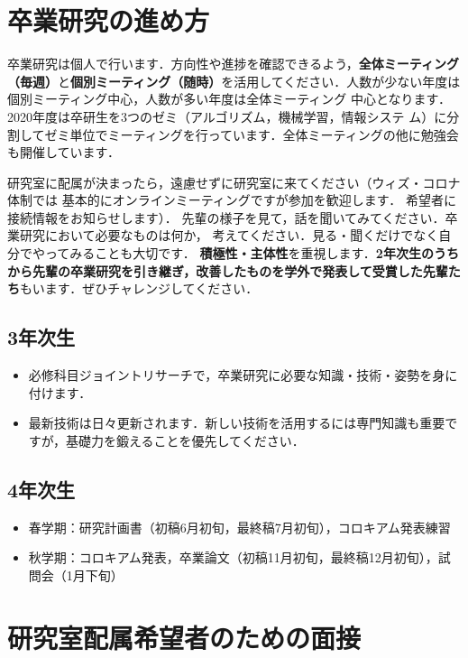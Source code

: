 \documentclass[uplatex,jis2004,a4paper]{jsarticle}
\renewcommand{\emph}[1]{\textbf{#1}}
\begin{document}
\clearpage
\section{卒業研究の進め方}

卒業研究は個人で行います．方向性や進捗を確認できるよう，\emph{全体ミーティング（毎週）}と\emph{個別ミーティング（随時）}を活用してください．人数が少ない年度は個別ミーティング中心，人数が多い年度は全体ミーティング
中心となります．2020年度は卒研生を3つのゼミ（アルゴリズム，機械学習，情報システ
ム）に分割してゼミ単位でミーティングを行っています．全体ミーティングの他に勉強会
も開催しています．

研究室に配属が決まったら，遠慮せずに研究室に来てください（ウィズ・コロナ体制では
基本的にオンラインミーティングですが参加を歓迎します．
希望者に接続情報をお知らせします）．
先輩の様子を見て，話を聞いてみてください．卒業研究において必要なものは何か，
考えてください．見る・聞くだけでなく自分でやってみることも大切です．
\emph{積極性・主体性}を重視します．\emph{2年次生のうちから先輩の卒業研究を引き継ぎ，改善したものを学外で発表して受賞した先輩たち}もいます．ぜひチャレンジしてください．
\vspace{-.3cm}
\subsection*{3年次生}
\vspace{-.3cm}
\begin{itemize}
  \item 必修科目ジョイントリサーチで，卒業研究に必要な知識・技術・姿勢を身に付けます．
  \item 最新技術は日々更新されます．新しい技術を活用するには専門知識も重要ですが，基礎力を鍛えることを優先してください．
\end{itemize}
\vspace{-.6cm}
\subsection*{4年次生}
\vspace{-.3cm}
\begin{itemize}
  \item 春学期：研究計画書（初稿6月初旬，最終稿7月初旬），コロキアム発表練習
  \item 秋学期：コロキアム発表，卒業論文（初稿11月初旬，最終稿12月初旬），試問会（1月下旬）
\end{itemize}

\section{研究室配属希望者のための面接}
\end{document}
